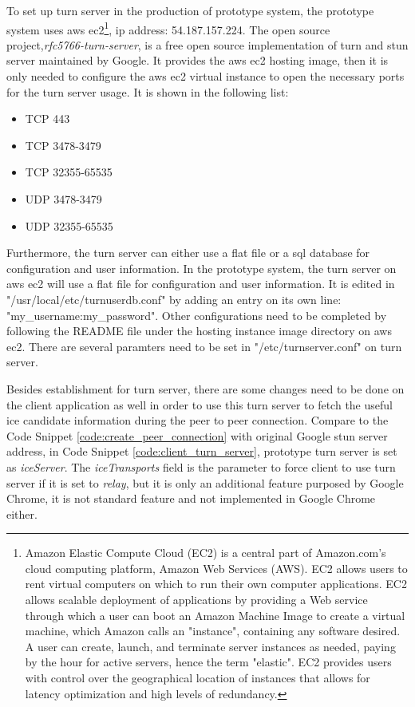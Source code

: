 \par To set up \gls{turn} server in the production of prototype system, the prototype system uses \gls{aws} \gls{ec2}\footnote{Amazon Elastic Compute Cloud (EC2) is a central part of Amazon.com's cloud computing platform, Amazon Web Services (AWS). EC2 allows users to rent virtual computers on which to run their own computer applications. EC2 allows scalable deployment of applications by providing a Web service through which a user can boot an Amazon Machine Image to create a virtual machine, which Amazon calls an "instance", containing any software desired. A user can create, launch, and terminate server instances as needed, paying by the hour for active servers, hence the term "elastic". EC2 provides users with control over the geographical location of instances that allows for latency optimization and high levels of redundancy.\cite{wiki:ec2}}, \gls{ip} address: 54.187.157.224. The open source project,\textit{rfc5766-turn-server}, is a free open source implementation of \gls{turn} and \gls{stun} server maintained by Google. It provides the \gls{aws} \gls{ec2} hosting image, then it is only needed to configure the \gls{aws} \gls{ec2} virtual instance to open the necessary ports for the \gls{turn} server usage. It is shown in the following list:
\begin{itemize}[topsep=-1em,parsep=0em,itemsep=0em]
 \item TCP 443
 \item TCP 3478-3479
 \item TCP 32355-65535
 \item UDP 3478-3479
 \item UDP 32355-65535
\end{itemize}

\par Furthermore, the \gls{turn} server can either use a flat file or a \gls{sql} database for configuration and user information. In the prototype system, the \gls{turn} server on \gls{aws} \gls{ec2} will use a flat file for configuration and user information. It is edited in "/usr/local/etc/turnuserdb.conf" by adding an entry on its own line: "my\_username:my\_password".\cite{dialogic:turn} Other configurations need to be completed by following the README file under the hosting instance image directory on \gls{aws} \gls{ec2}. There are several paramters need to be set in "/etc/turnserver.conf" on \gls{turn} server.

\par Besides establishment for \gls{turn} server, there are some changes need to be done on the client application as well in order to use this \gls{turn} server to fetch the useful \gls{ice} candidate information during the peer to peer connection. Compare to the Code Snippet \ref{code:create_peer_connection} with original Google \gls{stun} server address, in Code Snippet \ref{code:client_turn_server}, prototype \gls{turn} server is set as \textit{iceServer}. The \textit{iceTransports} field is the parameter to force client to use \gls{turn} server if it is set to \textit{relay}, but it is only an additional feature purposed by Google Chrome, it is not standard feature and not implemented in Google Chrome either.


